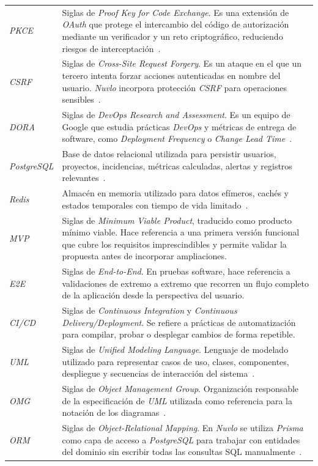 {\begin{longtable}{p{3.2cm}p{9.2cm}}
\textit{PKCE} & Siglas de \textit{Proof Key for Code Exchange}. Es una extensión de \textit{OAuth} que protege el intercambio del código de autorización mediante un verificador y un reto criptográfico, reduciendo riesgos de interceptación~\cite{OWASPOAuth2}. \\
\textit{CSRF} & Siglas de \textit{Cross-Site Request Forgery}. Es un ataque en el que un tercero intenta forzar acciones autenticadas en nombre del usuario. \textit{Nuvlo} incorpora protección \textit{CSRF} para operaciones sensibles~\cite{OWASPCSRF}. \\
\textit{DORA} & Siglas de \textit{DevOps Research and Assessment}. Es un equipo de Google que estudia prácticas \textit{DevOps} y métricas de entrega de software, como \textit{Deployment Frequency} o \textit{Change Lead Time}~\cite{DORAMetrics}. \\
\textit{PostgreSQL} & Base de datos relacional utilizada para persistir usuarios, proyectos, incidencias, métricas calculadas, alertas y registros relevantes~\cite{PostgreSQLDocs}. \\
\textit{Redis} & Almacén en memoria utilizado para datos efímeros, cachés y estados temporales con tiempo de vida limitado~\cite{RedisDocs}. \\
\textit{MVP} & Siglas de \textit{Minimum Viable Product}, traducido como producto mínimo viable. Hace referencia a una primera versión funcional que cubre los requisitos imprescindibles y permite validar la propuesta antes de incorporar ampliaciones. \\
\textit{E2E} & Siglas de \textit{End-to-End}. En pruebas software, hace referencia a validaciones de extremo a extremo que recorren un flujo completo de la aplicación desde la perspectiva del usuario. \\
\textit{CI/CD} & Siglas de \textit{Continuous Integration} y \textit{Continuous Delivery/Deployment}. Se refiere a prácticas de automatización para compilar, probar o desplegar cambios de forma repetible. \\
\textit{UML} & Siglas de \textit{Unified Modeling Language}. Lenguaje de modelado utilizado para representar casos de uso, clases, componentes, despliegue y secuencias de interacción del sistema~\cite{OMGUML251}. \\
\textit{OMG} & Siglas de \textit{Object Management Group}. Organización responsable de la especificación de \textit{UML} utilizada como referencia para la notación de los diagramas~\cite{OMGUML251}. \\
\textit{ORM} & Siglas de \textit{Object-Relational Mapping}. En \textit{Nuvlo} se utiliza \textit{Prisma} como capa de acceso a \textit{PostgreSQL} para trabajar con entidades del dominio sin escribir todas las consultas SQL manualmente~\cite{PrismaDocs}. \\

\end{longtable}}
